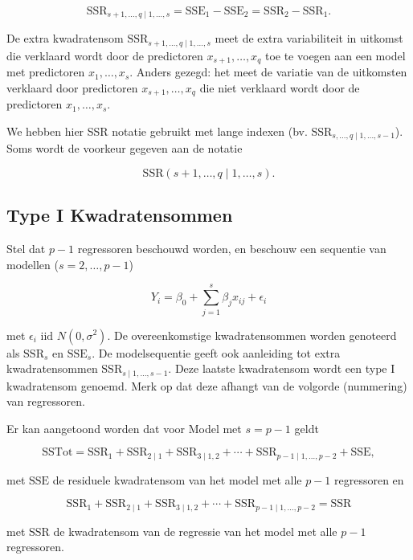 \documentclass[
  12pt,dutch,coursenotes]{book}
\theoremstyle{definition}
\theoremstyle{definition}
\theoremstyle{definition}
\theoremstyle{definition}
\theoremstyle{remark}
\begin{document}
\[
  \text{SSR}_{s+1, \ldots, q\mid 1,\ldots, s} = \text{SSE}_1-\text{SSE}_2=\text{SSR}_2-\text{SSR}_1.
\]

De extra kwadratensom \(\text{SSR}_{s+1, \ldots, q\mid 1,\ldots, s}\) meet de extra variabiliteit in uitkomst die verklaard wordt door de predictoren \(x_{s+1}, \ldots, x_q\) toe te voegen aan een model met predictoren \(x_1,\ldots, x_{s}\).
Anders gezegd: het meet de variatie van de uitkomsten verklaard door predictoren \(x_{s+1}, \ldots, x_q\) die niet verklaard wordt door de predictoren \(x_1,\ldots, x_{s}\).

We hebben hier SSR notatie gebruikt met lange indexen (bv. \(\text{SSR}_{s, \ldots, q\mid 1,\ldots, s-1}\)). Soms wordt de voorkeur gegeven aan de notatie

\[
  \text{SSR}(s+1, \ldots, q\mid 1,\ldots, s).
\]

\hypertarget{type-i-kwadratensommen}{%
\subsection{Type I Kwadratensommen}\label{type-i-kwadratensommen}}

Stel dat \(p-1\) regressoren beschouwd worden, en beschouw een sequentie van modellen (\(s=2,\ldots, p-1\))

\[
Y_i = \beta_0 + \sum_{j=1}^{s} \beta_j x_{ij} + \epsilon_i
\]

met \(\epsilon_i\text{ iid } N(0,\sigma^{2})\).
De overeenkomstige kwadratensommen worden genoteerd als \(\text{SSR}_{s}\) en \(\text{SSE}_{s}\). De modelsequentie geeft ook aanleiding tot extra kwadratensommen \(\text{SSR}_{s\mid 1,\ldots, s-1}\). Deze laatste kwadratensom wordt een type I kwadratensom genoemd. Merk op dat deze afhangt van de volgorde (nummering) van regressoren.

Er kan aangetoond worden dat voor Model met \(s=p-1\) geldt

\[
 \text{SSTot} = \text{SSR}_1 + \text{SSR}_{2\mid 1} + \text{SSR}_{3\mid 1,2} + \cdots + \text{SSR}_{p-1\mid 1,\ldots, p-2} + \text{SSE},
\]

met \(\text{SSE}\) de residuele kwadratensom van het model met alle \(p-1\) regressoren en

\[
  \text{SSR}_1 + \text{SSR}_{2\mid 1} + \text{SSR}_{3\mid 1,2} + \cdots + \text{SSR}_{p-1\mid 1,\ldots, p-2} = \text{SSR}
\]

met \(\text{SSR}\) de kwadratensom van de regressie van het model met alle \(p-1\) regressoren.
\end{document}
